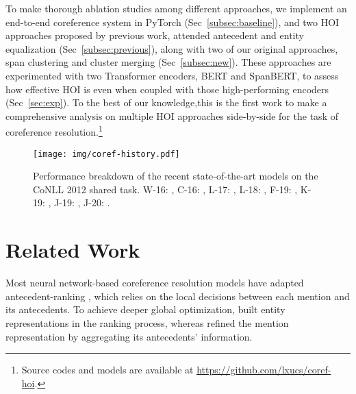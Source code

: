 \documentclass[11pt,a4paper]{article}
\newcommand\LN{\linebreak\noindent}
\begin{document}
\noindent To make thorough ablation studies among different approaches, we implement an end-to-end coreference system in PyTorch (Sec~\ref{subsec:baseline}),
and two HOI approaches proposed by previous work, attended antecedent and entity equalization (Sec~\ref{subsec:previous}), along with two of our original approaches, span clustering and cluster merging (Sec~\ref{subsec:new}).
These approaches are experimented with two Transformer encoders, BERT and SpanBERT, to assess how effective HOI is even when coupled with those high-performing encoders (Sec~\ref{sec:exp}).
To the best of our knowledge,\LN this is the first work to make a comprehensive analysis on multiple HOI approaches side-by-side for the task of coreference resolution.\footnote{Source codes and models are available at \url{https://github.com/lxucs/coref-hoi}.}

\begin{figure}[htbp!]
\centering
\texttt{[image: img/coref-history.pdf]}
\caption{Performance breakdown of the recent state-of-the-art models on the CoNLL 2012 shared task. W-16: \citet{wiseman-etal-2016-learning}, C-16: \citet{clark-manning-2016-improving}, L-17: \citet{lee-etal-2017-end}, L-18: \citet{lee-etal-2018-higher}, F-19: \citet{fei-etal-2019-end}, K-19: \citet{kantor-globerson-2019-coreference}, J-19: \citet{joshi-etal-2019-bert}, J-20: \citet{spanbert-joshi}.}
\label{fig:coref-history}
\end{figure}










%
 \vspace{-1.5ex}
\section{Related Work}
\label{sec:related}

Most neural network-based coreference resolution models have adapted antecedent-ranking \cite{wiseman-etal-2015-learning,clark-manning-2015-entity,lee-etal-2017-end,lee-etal-2018-higher,joshi-etal-2019-bert,spanbert-joshi}, which relies on the local decisions between each mention and its antecedents.
To achieve deeper global optimization,\LN \citet{wiseman-etal-2016-learning,clark-manning-2016-improving,yu-etal-2020-cluster} built entity representations in the ranking process, whereas \citet{lee-etal-2018-higher,kantor-globerson-2019-coreference} refined the mention representation by aggregating its antecedents' information.
\end{document}
